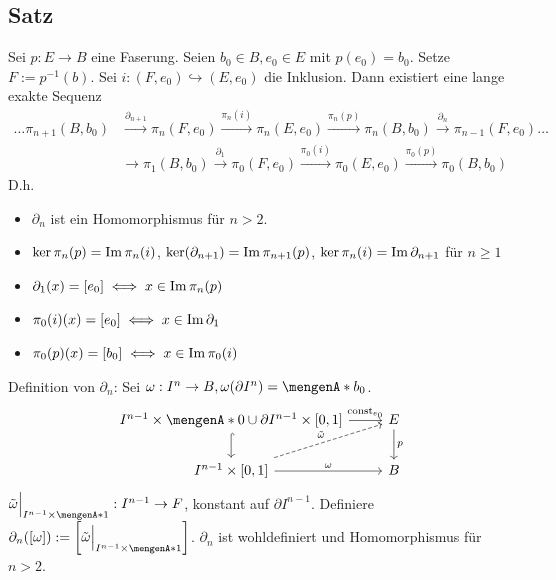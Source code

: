 \subsection{Satz} %
\label{sub:1411}
Sei $p : E \to B$ eine Faserung. Seien $b_0 \in B, e_0 \in E$ mit $p(e_0)= b_0$. Setze $F := p ^{-1}(b)$. Sei $i : (F, e_0) \hookrightarrow (E,e_0)$ die Inklusion.
Dann existiert eine lange exakte Sequenz
\begin{align*}
	\ldots  \pi_{n+1}(B,b_0) &\xrightarrow{\partial_{n+1}} \pi_n(F,e_0) \xrightarrow{\pi_n(i)} \pi_n(E,e_0) \xrightarrow{\pi_n(p)} \pi_n(B,b_0)  \xrightarrow{\partial_n} 
	\pi_{n-1}(F,e_0) \ldots \\
	&\longrightarrow \pi_1(B,b_0) \xrightarrow{\partial_1} \pi_0(F,e_0) \xrightarrow{\pi_0(i)} \pi_0(E,e_0) \xrightarrow{\pi_0(p)} \pi_0(B,b_0)   
\end{align*}
D.h.
\begin{itemize}
	\item $\partial_n$ ist ein Homomorphismus für $n >2$.
	\item $\ker \pi_n(p) = \operatorname{Im} \pi_n(i)$, $\ker( \partial_{n+1}) = \operatorname{Im} \pi_{n+1}(p)$, $\ker \pi_n(i) = \operatorname{Im} \partial_{n+1}$ für $n \ge 1$
	\item $\partial_1(x) = [e_0] \iff x \in \operatorname{Im} \pi_n(p)$
	\item $\pi_0(i)(x) = [e_0] \iff x \in \operatorname{Im} \partial_1$
	\item $\pi_0(p)(x) = [b_0] \iff x \in \operatorname{Im} \pi_0 (i)$
\end{itemize}
Definition von $\partial_n$: Sei $\omega : I^n \to B, \omega(\partial I^n) = \set{b_0} $.
\[
	\begin{tikzcd}
		I^{n-1} \times \set{0} \cup \partial I^{n-1} \times [0,1] \rar["\mathrm{const}_{e_0}"] \dar[hook]& E \dar["p"] \\
		I^{n-1} \times [0,1] \rar["\omega"] \urar[dashed, "\tilde{\omega}"]& B 
	\end{tikzcd}
\]
$\tilde{\omega}\Big|_{I^{n-1} \times \set{1}} : I^{n-1} \to F$, konstant auf $\partial I^{n-1}$. Definiere 
$\partial_n([\omega]) := \benbrace*{\tilde{\omega}\Big|_{I^{n-1} \times \set{1}}} $. $\partial_n$ ist wohldefiniert und Homomorphismus für $n >2$.

